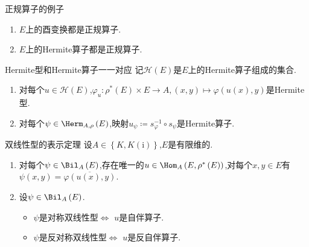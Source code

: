 \begin{example}{正规算子的例子}{}
	\begin{enumerate}
		\item $E$上的酉变换都是正规算子.
		\item $E$上的Hermite算子都是正规算子.
	\end{enumerate}
\end{example}

\begin{proposition}{Hermite型和Hermite算子一一对应}{}
	记$\mathcal{H}\left(E\right)$是$E$上的Hermite算子组成的集合.
	\begin{enumerate}
		\item 对每个$u\in\mathcal{H}\left(E\right)$,$\varphi_{u}:\rho^{\ast}\left(E\right)\times E\to A,\left(x,y\right)\mapsto\varphi\left(u\left(x\right),y\right)$是Hermite型.
		\item 对每个$\psi\in\Herm_{A,\rho}\left(E\right)$,映射$u_{\psi}\coloneq s_{\varphi}^{-1}\circ s_{\psi}$是Hermite算子.
	\end{enumerate}
\end{proposition}

\begin{proposition}{双线性型的表示定理}{}
	设$A\in\left\{K,K(\mathrm{i})\right\}$,$E$是有限维的.
	\begin{enumerate}
		\item 对每个$\psi\in\Bil_{A}\left(E\right)$,存在唯一的$u\in\Hom_{A}\left(E,\rho^{\ast}\left(E\right)\right)$,对每个$x,y\in E$有$\psi\left(x,y\right)=\overline{\varphi\left(u\left(x\right),y\right)}$.
		\item 设$\psi\in\Bil_{A}\left(E\right)$.
		\begin{itemize}
			\item $\psi$是对称双线性型$\iff$ $u$是自伴算子.
			\item $\psi$是反对称双线性型$\iff$ $u$是反自伴算子.
		\end{itemize}
	\end{enumerate}
\end{proposition}

